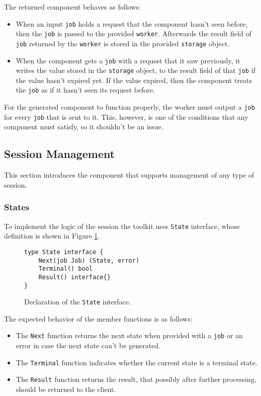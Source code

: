 \newpage
The returned component behaves as follows:
\begin{itemize}
  \item When an input \texttt{job} holds a request that the component 
        hasn't seen before, then the \texttt{job} is passed to the 
        provided \texttt{worker}. Afterwards the result field of \texttt{job}
        returned by the \texttt{worker} is stored in the provided 
        \texttt{storage} object.

  \item When the component gets a \texttt{job} with a request that it saw 
        previously, it writes the value stored in the \texttt{storage} object,
        to the result field of that \texttt{job} if the value hasn't expired yet. 
        If the value expired, then the component treats the \texttt{job} as if it
        hasn't seen its request before.
\end{itemize}

For the generated component to function properly, the worker must output
a \texttt{job} for every \texttt{job} that is sent to it. This, however, 
is one of the conditions that any component must satisfy, so it shouldn't 
be an issue.

\subsection{Session Management}
This section introduces the component that supports management of any
type of session.
\subsubsection{States}
\label{sec:state}
To implement the logic of the session the toolkit uses \texttt{State}
interface, whose definition is shown in Figure \ref{fig:State}.
\begin{figure}[h]
\centering
\begin{lstlisting}
type State interface {
    Next(job Job) (State, error)
    Terminal() bool
    Result() interface{}
}
\end{lstlisting}
\caption[scale=1.0]{Declaration of the \texttt{State} interface.}
\label{fig:State}
\end{figure}
The expected behavior of the member functions is as follows:
\begin{itemize}
	\item The \texttt{Next} function returns the next state when provided 
          with a \texttt{job} or an error in case the next state can't be 
          generated.
	\item The \texttt{Terminal} function indicates whether the current 
          state is a terminal state.
	\item The \texttt{Result} function returns the result, that possibly 
          after further processing, should be returned to the client.
\end{itemize}

